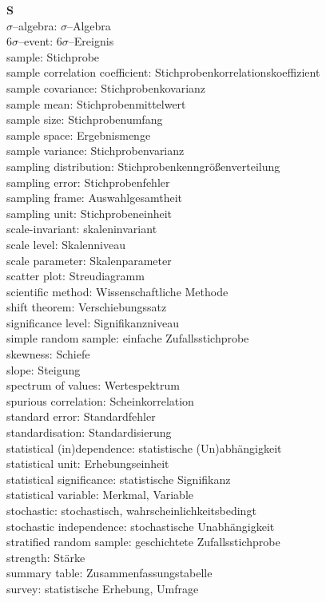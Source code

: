 \medskip
\noindent
{\bf S}\\
$\sigma$--algebra: $\sigma$--Algebra\\
$6\sigma$--event: $6\sigma$--Ereignis\\
sample: Stichprobe\\
sample correlation coefficient: 
Stichprobenkorrelationskoeffizient\\
sample covariance: Stichprobenkovarianz\\
sample mean: Stichprobenmittelwert\\
sample size: Stichprobenumfang\\
sample space: Ergebnismenge\\
sample variance: Stichprobenvarianz\\
sampling distribution: Stichprobenkenngr\"{o}\ss enverteilung\\
sampling error: Stichprobenfehler\\
sampling frame: Auswahlgesamtheit\\
sampling unit: Stichprobeneinheit\\
scale-invariant: skaleninvariant\\
scale level: Skalenniveau\\
scale parameter: Skalenparameter\\
scatter plot: Streudiagramm\\
scientific method: Wissenschaftliche Methode\\
shift theorem: Verschiebungssatz\\
significance level: Signifikanzniveau\\
simple random sample: einfache Zufallsstichprobe\\
skewness: Schiefe\\
slope: Steigung\\
spectrum of values: Wertespektrum\\
spurious correlation: Scheinkorrelation\\
standard error: Standardfehler\\
standardisation: Standardisierung\\
statistical (in)dependence: statistische (Un)abh\"{a}ngigkeit\\
statistical unit: Erhebungseinheit\\
statistical significance: statistische Signifikanz\\
statistical variable: Merkmal, Variable\\
stochastic: stochastisch, wahrscheinlichkeitsbedingt\\
stochastic independence: stochastische Unabh\"{a}ngigkeit\\
stratified random sample: geschichtete Zufallsstichprobe\\
strength: St\"{a}rke\\
summary table: Zusammenfassungstabelle\\
survey: statistische Erhebung, Umfrage

